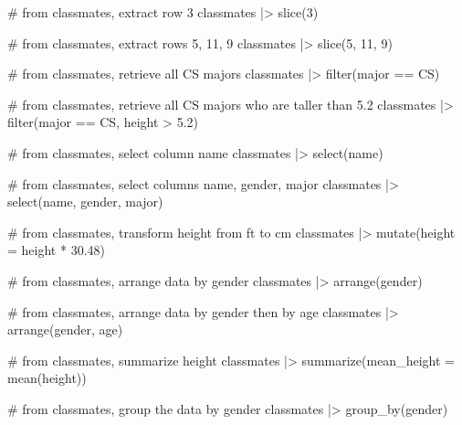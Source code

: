 \documentclass[
  letterpaper,
  DIV=11,
  numbers=noendperiod]{scrreprt}
\newenvironment{Shaded}{\begin{snugshade}}{\end{snugshade}}
\newcommand{\AttributeTok}[1]{\textcolor[rgb]{0.40,0.45,0.13}{#1}}
\newcommand{\CommentTok}[1]{\textcolor[rgb]{0.37,0.37,0.37}{#1}}
\newcommand{\DecValTok}[1]{\textcolor[rgb]{0.68,0.00,0.00}{#1}}
\newcommand{\FloatTok}[1]{\textcolor[rgb]{0.68,0.00,0.00}{#1}}
\newcommand{\FunctionTok}[1]{\textcolor[rgb]{0.28,0.35,0.67}{#1}}
\newcommand{\NormalTok}[1]{\textcolor[rgb]{0.00,0.23,0.31}{#1}}
\newcommand{\SpecialCharTok}[1]{\textcolor[rgb]{0.37,0.37,0.37}{#1}}
\newcommand{\StringTok}[1]{\textcolor[rgb]{0.13,0.47,0.30}{#1}}
\begin{document}
\begin{Shaded}
\begin{Highlighting}[]
\CommentTok{\# from classmates, extract row 3}
\NormalTok{classmates }\SpecialCharTok{|\textgreater{}} \FunctionTok{slice}\NormalTok{(}\DecValTok{3}\NormalTok{)}

\CommentTok{\# from classmates, extract rows 5, 11, 9}
\NormalTok{classmates }\SpecialCharTok{|\textgreater{}} \FunctionTok{slice}\NormalTok{(}\DecValTok{5}\NormalTok{, }\DecValTok{11}\NormalTok{, }\DecValTok{9}\NormalTok{)}

\CommentTok{\# from classmates, retrieve all CS majors}
\NormalTok{classmates }\SpecialCharTok{|\textgreater{}} \FunctionTok{filter}\NormalTok{(major }\SpecialCharTok{==} \StringTok{\textquotesingle{}CS\textquotesingle{}}\NormalTok{)}

\CommentTok{\# from classmates, retrieve all CS majors who are taller than 5.2}
\NormalTok{classmates }\SpecialCharTok{|\textgreater{}} \FunctionTok{filter}\NormalTok{(major }\SpecialCharTok{==} \StringTok{\textquotesingle{}CS\textquotesingle{}}\NormalTok{, height }\SpecialCharTok{\textgreater{}} \FloatTok{5.2}\NormalTok{)}

\CommentTok{\# from classmates, select column name}
\NormalTok{classmates }\SpecialCharTok{|\textgreater{}} \FunctionTok{select}\NormalTok{(name)}

\CommentTok{\# from classmates, select columns name, gender, major}
\NormalTok{classmates }\SpecialCharTok{|\textgreater{}} \FunctionTok{select}\NormalTok{(name, gender, major)}

\CommentTok{\# from classmates, transform height from ft to cm}
\NormalTok{classmates }\SpecialCharTok{|\textgreater{}} \FunctionTok{mutate}\NormalTok{(}\AttributeTok{height =}\NormalTok{ height }\SpecialCharTok{*} \FloatTok{30.48}\NormalTok{)}

\CommentTok{\# from classmates, arrange data by gender}
\NormalTok{classmates }\SpecialCharTok{|\textgreater{}} \FunctionTok{arrange}\NormalTok{(gender)}

\CommentTok{\# from classmates, arrange data by gender then by age}
\NormalTok{classmates }\SpecialCharTok{|\textgreater{}} \FunctionTok{arrange}\NormalTok{(gender, age)}

\CommentTok{\# from classmates, summarize height }
\NormalTok{classmates }\SpecialCharTok{|\textgreater{}} \FunctionTok{summarize}\NormalTok{(}\AttributeTok{mean\_height =} \FunctionTok{mean}\NormalTok{(height))}

\CommentTok{\# from classmates, group the data by gender}
\NormalTok{classmates }\SpecialCharTok{|\textgreater{}} \FunctionTok{group\_by}\NormalTok{(gender)}
\end{Highlighting}
\end{Shaded}
\end{document}
